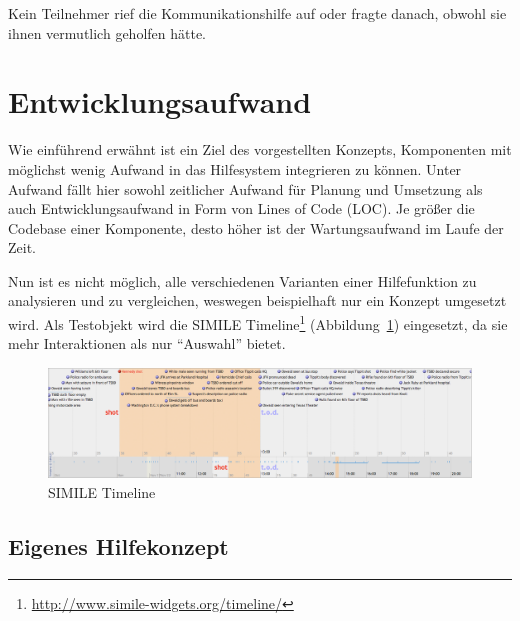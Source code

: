\documentclass[
	headsepline,
	footsepline,
	fontsize=12pt,
	bibliography=totoc
]{scrbook}
\begin{document}

Kein Teilnehmer rief die Kommunikationshilfe auf oder fragte danach, obwohl sie ihnen vermutlich geholfen hätte.



\section{Entwicklungsaufwand}
\label{section:evaluation:entwicklungsaufwand}

Wie einführend erwähnt ist ein Ziel des vorgestellten Konzepts, Komponenten mit möglichst wenig Aufwand in das Hilfesystem integrieren zu können. Unter Aufwand fällt hier sowohl zeitlicher Aufwand für Planung und Umsetzung als auch Entwicklungsaufwand in Form von Lines of Code (LOC). Je größer die Codebase einer Komponente, desto höher ist der Wartungsaufwand im Laufe der Zeit.

Nun ist es nicht möglich, alle verschiedenen Varianten einer Hilfefunktion zu analysieren und zu vergleichen, weswegen beispielhaft nur ein Konzept umgesetzt wird. Als Testobjekt wird die SIMILE Timeline\footnote{\url{http://www.simile-widgets.org/timeline/}} (Abbildung~\ref{figure:simile-timeline}) eingesetzt, da sie mehr Interaktionen als nur \enquote{Auswahl} bietet.

\begin{figure}[htbp]
   \centering
   \includegraphics[width=\textwidth]{images/evaluation-simile-timeline.png}
   \caption{SIMILE Timeline}
   \label{figure:simile-timeline}
\end{figure}

\subsection{Eigenes Hilfekonzept}
\label{section:evaluation:entwicklungsaufwand:eigeneskonzept}
\end{document}
